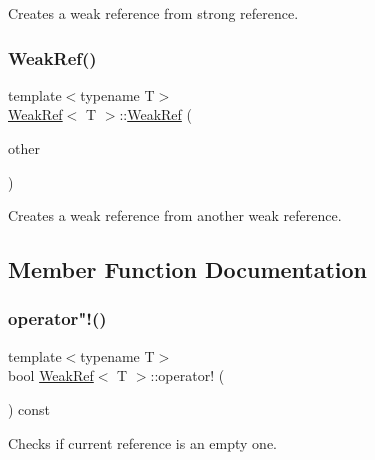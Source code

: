 Creates a weak reference from strong reference. 

\mbox{\label{class_weak_ref_a85ba02cd6bba30a98734a837dd900b2a}} 
\subsubsection{\texorpdfstring{WeakRef()}{WeakRef()}\hspace{0.1cm}{\footnotesize\ttfamily [4/4]}}
{\footnotesize\ttfamily template$<$typename T$>$ \\
\mbox{\hyperlink{class_weak_ref}{Weak\+Ref}}$<$ T $>$\+::\mbox{\hyperlink{class_weak_ref}{Weak\+Ref}} (\begin{DoxyParamCaption}\item[{const \mbox{\hyperlink{class_weak_ref}{Weak\+Ref}}$<$ T $>$ \&}]{other }\end{DoxyParamCaption})\hspace{0.3cm}{\ttfamily [inline]}}



Creates a weak reference from another weak reference. 



\subsection{Member Function Documentation}
\mbox{\label{class_weak_ref_ab7bcaf37aab16bd3384bdabaf624b043}} 
\subsubsection{\texorpdfstring{operator"!()}{operator!()}}
{\footnotesize\ttfamily template$<$typename T$>$ \\
bool \mbox{\hyperlink{class_weak_ref}{Weak\+Ref}}$<$ T $>$\+::operator! (\begin{DoxyParamCaption}{ }\end{DoxyParamCaption}) const\hspace{0.3cm}{\ttfamily [inline]}}



Checks if current reference is an empty one. 

